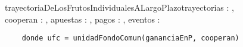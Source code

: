 \documentclass[document.tex]{subfiles}
\begin{document}
\begin{proc}{trayectoriaDeLosFrutosIndividualesALargoPlazo}{\Inout trayectorias : \TLista{\TLista{\float}},\\ \In cooperan : \TLista{\bool}, \In apuestas : \TLista{\TLista{\float}}, \In pagos : \TLista{\TLista{\float}}, \In eventos : \TLista{\TLista{\nat}}}{}

\begin{verbatim}
    donde ufc = unidadFondoComun(gananciaEnP, cooperan)
\end{verbatim}
\end{proc}
\end{document}
